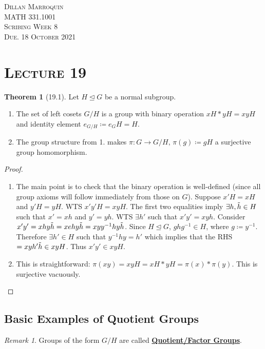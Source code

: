 \documentclass{article}
\newcommand{\coleq}{\coloneqq}
\newcommand{\inverse}[1]{#1^{-1}}
\newcommand{\define}[1]{\textbf{\underline{#1}}}
\newcommand{\func}[3]{#1: #2 \to #3}
\theoremstyle{definition}
\newtheorem*{thm}{Theorem}
\theoremstyle{remark}
\newtheorem*{rmk}{Remark}
\newcommand{\normal}{\unlhd}
\begin{document}
    \begin{center}
        \textsc{Dillan Marroquin\\MATH 331.1001\\Scribing Week 8\\Due. 18 October 2021\\}
    \end{center}
        
    \noindent\section*{\textbf{\textsc{Lecture 19}}}{
        \begin{thm}[19.1]
            Let $H\normal G$ be a normal subgroup.
            \begin{enumerate}
                \item The set of left cosets $G/H$ is a group with binary operation $xH*yH=xyH$ and identity element $e_{G/H}\coleq e_GH=H$.
                \item The group structure from 1. makes $\func{\pi}{G}{G/H}, \, \pi(g)\coleq gH$ a surjective group homomorphism.
            \end{enumerate}
        \end{thm}
        
        \begin{proof}
            \noindent\begin{enumerate}
                \item The main point is to check that the binary operation is well-defined (since all group axioms will follow immediately from those on $G$). Suppose $x'H=xH$ and $y'H=yH$. WTS $x'y'H=xyH$. The first two equalities imply $\exists h,\Tilde{h}\in H$ such that $x'=xh$ and $y'=yh$. WTS $\exists h'$ such that $x'y'=xyh$. Consider $x'y'=xhy\Tilde{h}=xehy\Tilde{h}=xy\inverse{y}hy\Tilde{h}$. Since $H \normal G$, $gh\inverse{g}\in H$, where $g \coleq \inverse{y}$. Therefore $\exists h' \in H$ such that $\inverse{y}hy=h'$ which implies that the RHS$=xyh'\Tilde{h}\in xyH$. Thus $x'y'\in xyH$.
                \item This is straightforward: $\pi(xy)=xyH=xH*yH=\pi(x)*\pi(y)$. This is surjective vacuously.
            \end{enumerate}
        \end{proof}
        
        \subsection*{Basic Examples of Quotient Groups}{
            \begin{rmk}
                Groups of the form $G/H$ are called \define{Quotient/Factor Groups}.
            \end{rmk}
                
}}
\end{document}
